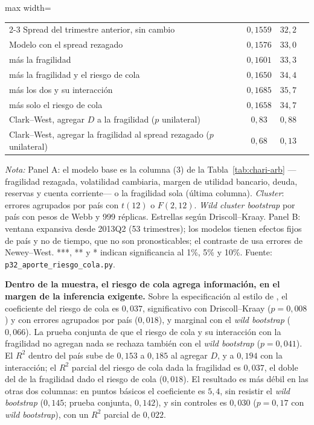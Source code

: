 \begin{table}[htbp]
\begin{adjustbox}{max width=\linewidth}
\begin{tabular}{l ccc}
\cmidrule(lr){2-3}
\quad Spread del trimestre anterior, sin cambio & $0{,}1559$ & $32{,}2$ & \\
\quad Modelo con el spread rezagado & $0{,}1576$ & $33{,}0$ & \\
\quad \quad más la fragilidad & $0{,}1601$ & $33{,}3$ & \\
\quad \quad más la fragilidad y el riesgo de cola & $0{,}1650$ & $34{,}4$ & \\
\quad \quad más los dos y su interacción & $0{,}1685$ & $35{,}7$ & \\
\quad \quad más solo el riesgo de cola & $0{,}1658$ & $34{,}7$ & \\
\quad Clark--West, agregar $D$ a la fragilidad ($p$ unilateral) & $0{,}83$ & $0{,}88$ & \\
\quad Clark--West, agregar la fragilidad al spread rezagado ($p$ unilateral) & $0{,}68$ & $0{,}13$ & \\
\bottomrule
\end{tabular}
\end{adjustbox}
\par\smallskip\parbox{0.95\linewidth}{\footnotesize \textit{Nota:} Panel A: el modelo base es la columna (3) de la Tabla~\ref{tab:chari-arb} ---fragilidad rezagada, volatilidad cambiaria, margen de utilidad bancario, deuda, reservas y cuenta corriente--- o la fragilidad sola (última columna). \textit{Cluster}: errores agrupados por país con $t(12)$ o $F(2,12)$. \textit{Wild cluster bootstrap} por país con pesos de Webb y 999 réplicas. Estrellas según Driscoll--Kraay. Panel B: ventana expansiva desde 2013Q2 (53 trimestres); los modelos tienen efectos fijos de país y no de tiempo, que no son pronosticables; el contraste de \citet{ClarkWest2007} usa errores de Newey--West. ***, ** y * indican significancia al 1\%, 5\% y 10\%. Fuente: \texttt{p32\_aporte\_riesgo\_cola.py}.}
\end{table}

\textbf{Dentro de la muestra, el riesgo de cola agrega información, en el margen de la inferencia exigente.} Sobre la especificación al estilo de \citet{Chari2024b}, el coeficiente del riesgo de cola es $0{,}037$, significativo con Driscoll--Kraay ($p=0{,}008$) y con errores agrupados por país ($0{,}018$), y marginal con el \textit{wild bootstrap} ($0{,}066$). La prueba conjunta de que el riesgo de cola y su interacción con la fragilidad no agregan nada se rechaza también con el \textit{wild bootstrap} ($p=0{,}041$). El $R^2$ dentro del país sube de $0{,}153$ a $0{,}185$ al agregar $D$, y a $0{,}194$ con la interacción; el $R^2$ parcial del riesgo de cola dada la fragilidad es $0{,}037$, el doble del de la fragilidad dado el riesgo de cola ($0{,}018$). El resultado es más débil en las otras dos columnas: en puntos básicos el coeficiente es $5{,}4$, sin resistir el \textit{wild bootstrap} ($0{,}145$; prueba conjunta, $0{,}142$), y sin controles es $0{,}030$ ($p=0{,}17$ con \textit{wild bootstrap}), con un $R^2$ parcial de $0{,}022$.


